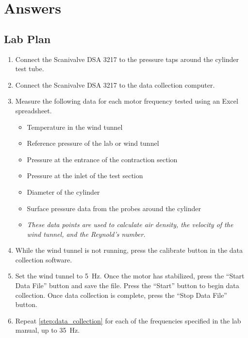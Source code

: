 \chapter{Answers}
\label{cp:answers}
\section{Lab Plan}

\begin{enumerate}
    \item Connect the Scanivalve DSA 3217 to the pressure taps around the cylinder test tube.
    \item Connect the Scanivalve DSA 3217 to the data collection computer.
    \item Measure the following data for each motor frequency tested using an Excel spreadsheet.
    \begin{itemize}
        \item Temperature in the wind tunnel
        \item Reference pressure of the lab or wind tunnel
        \item Pressure at the entrance of the contraction section
        \item Pressure at the inlet of the test section
        \item Diameter of the cylinder
        \item Surface pressure data from the probes around the cylinder
        \item \textit{These data points are used to calculate air density, the velocity of the wind tunnel, and the Reynold's number.}
    \end{itemize}
    \item While the wind tunnel is not running, press the calibrate button in the data collection software.
    \item Set the wind tunnel to \qty{5}{\hertz}. Once the motor has stabilized, press the ``Start Data File'' button and save the file. Press the ``Start'' button to begin data collection. Once data collection is complete, press the ``Stop Data File'' button.\label{step:data_collection}
    \item Repeat \autoref{step:data_collection} for each of the frequencies specified in the lab manual, up to \qty{35}{\hertz}.
\end{enumerate}